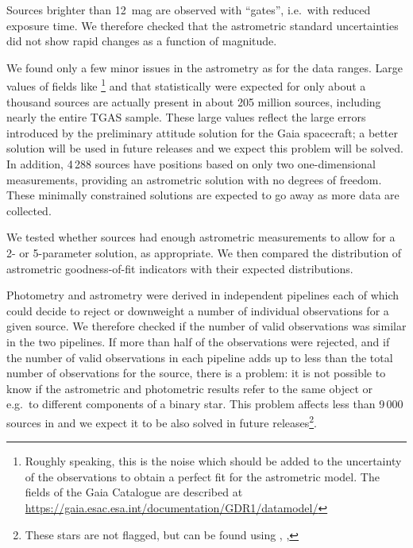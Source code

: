 Sources brighter than  12~mag are observed with ``gates'', i.e.\ with
reduced exposure time. We therefore checked that the astrometric standard
uncertainties did not show rapid changes as a function of magnitude.

We found only a few minor issues in the {} astrometry as for the data ranges. 
Large values of fields like \footnote{Roughly speaking, this 
is the noise which should be added to the uncertainty of the observations to obtain a perfect
fit for the astrometric model. The
fields of the Gaia Catalogue are described at {\small\url{https://gaia.esac.esa.int/documentation/GDR1/datamodel/}}} 
and  that statistically were expected for only about a thousand sources are actually present in about 205 million sources, including nearly the entire TGAS sample. These large values reflect the large errors introduced by the preliminary attitude solution for the Gaia spacecraft; a better solution will be used in future releases \citep{DPACP-14} and we expect this problem will be solved. In addition, 4\,288 sources have positions based on only two one-dimensional measurements, providing an astrometric solution with no degrees of freedom. These minimally constrained solutions are expected to go away as more data are collected.

We tested whether sources had enough astrometric measurements 
to allow for a 2- or 5-parameter solution, as appropriate. We then compared the distribution of 
astrometric goodness-of-fit indicators with their expected distributions.

Photometry and astrometry were derived in independent pipelines each of which
could decide to reject or downweight a number of individual observations for a
given source.  We therefore checked if the number of valid observations was
similar in the two pipelines. If more than half of the observations were
rejected, and if the number of valid observations in each pipeline adds up to
less than the total number of observations for the source, there is a problem:
it is not possible to know if the astrometric and
photometric results refer to the same object or e.g.\ to different components
of a binary star. This problem affects less than 9\,000 sources in {}
and we expect it to be also solved in future releases\footnote{These stars are not 
flagged, but can be found using , , 
}.

